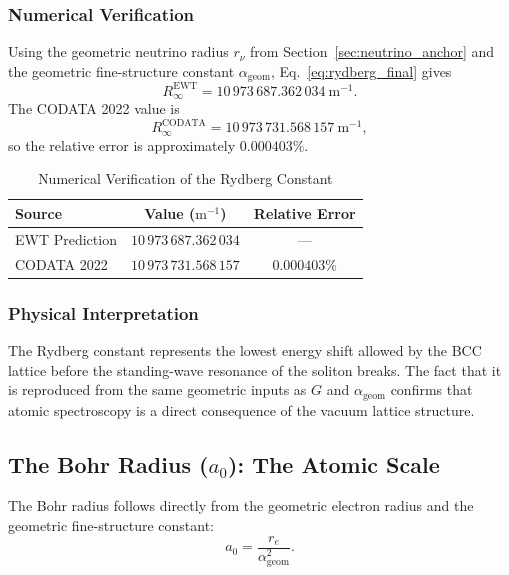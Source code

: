 \documentclass[10pt,a4paper]{article}
\begin{document}
\subsubsection{Numerical Verification}

Using the geometric neutrino radius \(r_\nu\) from Section~\ref{sec:neutrino_anchor} and the geometric fine-structure constant \(\alpha_{\text{geom}}\), Eq.~\eqref{eq:rydberg_final} gives
\begin{equation}
	R_{\infty}^{\text{EWT}}
	=
	10\,973\,687.362\,034\ \text{m}^{-1}.
\end{equation}
The CODATA 2022 value is
\begin{equation}
	R_{\infty}^{\text{CODATA}}
	=
	10\,973\,731.568\,157\ \text{m}^{-1},
\end{equation}
so the relative error is approximately \(0.000403\%\).

\begin{table}[h]
	\centering
	\caption{Numerical Verification of the Rydberg Constant}
	\label{tab:rydberg_verification}
	\begin{tabular}{lcc}
		\toprule
		\textbf{Source} & \textbf{Value} (\(\text{m}^{-1}\)) & \textbf{Relative Error} \\
		\midrule
		EWT Prediction & \(10\,973\,687.362\,034\) & --- \\
		CODATA 2022 & \(10\,973\,731.568\,157\) & \(0.000403\%\) \\
		\bottomrule
	\end{tabular}
\end{table}

\subsubsection{Physical Interpretation}

The Rydberg constant represents the lowest energy shift allowed by the BCC lattice before the standing-wave resonance of the soliton breaks. The fact that it is reproduced from the same geometric inputs as \(G\) and \(\alpha_{\text{geom}}\) confirms that atomic spectroscopy is a direct consequence of the vacuum lattice structure.

\subsection{The Bohr Radius (\(a_0\)): The Atomic Scale}
\label{sec:bohr_radius}

The Bohr radius follows directly from the geometric electron radius and the geometric fine-structure constant:
\begin{equation}
	a_0 = \frac{r_e}{\alpha_{\text{geom}}^2}.
	\label{eq:bohr_standard}
\end{equation}
\end{document}

